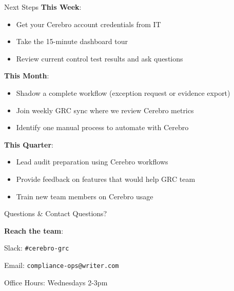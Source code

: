 \documentclass[aspectratio=169]{beamer}
\begin{document}
\begin{frame}{Next Steps}
  \textbf{This Week}:
  \begin{itemize}
    \item Get your Cerebro account credentials from IT
    \item Take the 15-minute dashboard tour
    \item Review current control test results and ask questions
  \end{itemize}
  
  \vspace{0.3cm}
  
  \textbf{This Month}:
  \begin{itemize}
    \item Shadow a complete workflow (exception request or evidence export)
    \item Join weekly GRC sync where we review Cerebro metrics
    \item Identify one manual process to automate with Cerebro
  \end{itemize}
  
  \vspace{0.3cm}
  
  \textbf{This Quarter}:
  \begin{itemize}
    \item Lead audit preparation using Cerebro workflows
    \item Provide feedback on features that would help GRC team
    \item Train new team members on Cerebro usage
  \end{itemize}
\end{frame}

\begin{frame}{Questions \& Contact}
  \centering
  \Large
  Questions?
  
  \vspace{1cm}
  
  \normalsize
  \textbf{Reach the team}:
  
  Slack: \texttt{\#cerebro-grc}
  
  Email: \texttt{compliance-ops@writer.com}
  
  \vspace{0.5cm}
  
  Office Hours: Wednesdays 2-3pm
\end{frame}
\end{document}
